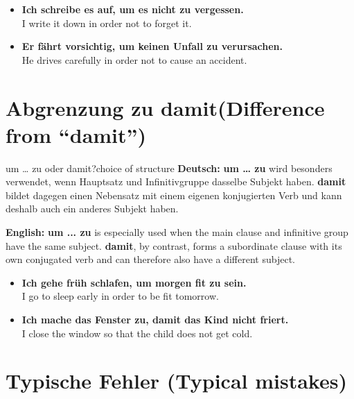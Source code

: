 \documentclass[a4paper,11pt]{article}
\newcommand{\GermanText}[1]{\textbf{Deutsch: }#1\par}
\newcommand{\EnglishText}[1]{{\small\color{SoftGray}\textbf{English: }#1\par}}
\newcommand{\ExampleItem}[2]{\item \textbf{#1}\\{\small\color{SoftGray}#2}}
\begin{document}
        \begin{exbox}
            \begin{itemize}
                \ExampleItem{Ich schreibe es auf, um es nicht zu vergessen.}{I write it down in order not to forget it.}
                \ExampleItem{Er fährt vorsichtig, um keinen Unfall zu verursachen.}{He drives carefully in order not to cause an accident.}
            \end{itemize}
        \end{exbox}


    \section{Abgrenzung zu \glqq damit\grqq \textnormal{(Difference from ``damit'')}}

        \begin{grammarentry}{um \ldots{} zu oder damit?}{choice of structure}
            \GermanText{\textbf{um \ldots{} zu} wird besonders verwendet, wenn Hauptsatz und Infinitivgruppe dasselbe Subjekt haben. \textbf{damit} bildet dagegen einen Nebensatz mit einem eigenen konjugierten Verb und kann deshalb auch ein anderes Subjekt haben.}
            \EnglishText{\textbf{um ... zu} is especially used when the main clause and infinitive group have the same subject. \textbf{damit}, by contrast, forms a subordinate clause with its own conjugated verb and can therefore also have a different subject.}
        \end{grammarentry}

        \begin{exbox}
            \begin{itemize}
                \ExampleItem{Ich gehe früh schlafen, um morgen fit zu sein.}{I go to sleep early in order to be fit tomorrow.}
                \ExampleItem{Ich mache das Fenster zu, damit das Kind nicht friert.}{I close the window so that the child does not get cold.}
            \end{itemize}
        \end{exbox}


    \section{Typische Fehler \textnormal{(Typical mistakes)}}
\end{document}
